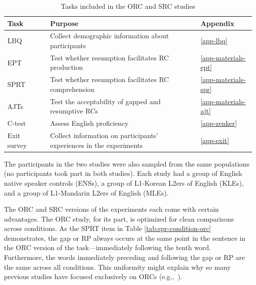\begin{table}
\caption{Tasks included in the ORC and SRC studies}\label{tab:task}
\raggedright{}
\begin{tabularx}{\linewidth}{lLl}\toprule
Task & Purpose & Appendix \\\midrule
LBQ & Collect demographic information about participants & \ref{app-lbq} \\
EPT & Test whether resumption facilitates RC production & \ref{app-materials-ept} \\
SPRT & Test whether resumption facilitates RC comprehension & \ref{app-materials-spr} \\
AJTs & Test the acceptability of gapped and resumptive RCs & \ref{app-materials-ajt} \\
C-test & Assess English proficiency & \ref{app-zenker} \\
Exit survey~~ & Collect information on participants' experiences in the experiments & \ref{app-exit} \\\bottomrule
\end{tabularx}
\vspace{-12pt}
\end{table}

\noindent The participants in the two studies were also sampled from the same populations (no participants took part in both studies). Each study had a group of English native speaker controls (ENSs), a group of L1-Korean L2ers of English (KLEs), and a group of L1-Mandarin L2ers of English (MLEs).

The ORC and SRC versions of the experiments each come with certain advantages.\footnotemark{} The ORC study, for its part, is optimized for clean comparisons across conditions. As the SPRT item in Table \ref{tab:spr-condition-orc} demonstrates, the gap or RP always occurs at the same point in the sentence in the ORC version of the task---immediately following the tenth word. Furthermore, the words immediately preceding and following the gap or RP are the same across all conditions. This uniformity might explain why so many previous studies have focused exclusively on ORCs (e.g.,~\cite{beltrama.xiang2016,hammerly2022,heestand.etal2011,hofmeister.norcliffe2013}).


